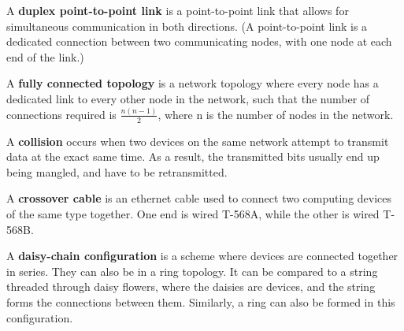 A \textbf{duplex point-to-point link} is a point-to-point link that allows for
simultaneous communication in both directions. (A point-to-point link is a
dedicated connection between two communicating nodes, with one node at each end
of the link.)


A \textbf{fully connected topology} is a network topology where every node has a
dedicated link to every other node in the network, such that the number of
connections required is \(\frac{n(n-1)}{2}\), where n is the number of nodes in
the network.

A \textbf{collision} occurs when two devices on the same network attempt to
transmit data at the exact same time. As a result, the transmitted bits usually
end up being mangled, and have to be retransmitted.


A \textbf{crossover cable} is an ethernet cable used to connect two computing
devices of the same type together. One end is wired T-568A, while the other is
wired T-568B.


A \textbf{daisy-chain configuration} is a scheme where devices are connected
together in series. They can also be in a ring topology. It can be compared to a
string threaded through daisy flowers, where the daisies are devices, and the
string forms the connections between them. Similarly, a ring can also be formed
in this configuration.
